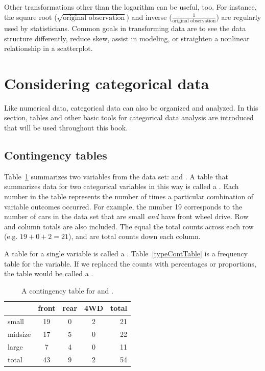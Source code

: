 Other transformations other than the logarithm can be useful, too. For instance, the square root ($\sqrt{\text{original observation}}$) and inverse ($\frac{1}{\text{original observation}}$) are regularly used by statisticians. Common goals in transforming data are to see the data structure differently, reduce skew, assist in modeling, or straighten a nonlinear relationship in a scatterplot.

\section{Considering categorical data}
\label{categoricalData}

Like numerical data, categorical data can also be organized and analyzed. %
In this section, tables and other basic tools for categorical data analysis are introduced that will be used throughout this book.

\subsection{Contingency tables}

Table~\ref{typeDriveTrainTableTotals} summarizes two variables from the  data set:  and . A table that summarizes data for two categorical variables in this way is called a . Each number in the table represents the number of times a particular combination of variable outcomes occurred. For example, the number 19 corresponds to the number of cars in the data set that are small \emph{and} have front wheel drive. Row and column totals are also included. The  equal the total counts across each row (e.g. $19+0+2=21$), and  are total counts down each column.

A table for a single variable is called a . Table~\ref{typeContTable} is a frequency table for the  variable. If we replaced the counts with percentages or proportions, the table would be called a .

\begin{table}[ht]
\centering
\begin{tabular}{l | ccc | r}
  \hline
 & front & rear & 4WD & total \\ 
  \hline
small &  19 &   0 & 2 & 21 \\ 
midsize &  17 &  5 & 0 & 22 \\ 
large &   7 &   4 & 0 & 11 \\ 
   \hline
total & 43 & 9 & 2 & 54 \\
   \hline
\end{tabular}
\caption{A contingency table for  and .}
\label{typeDriveTrainTableTotals}
\end{table}

